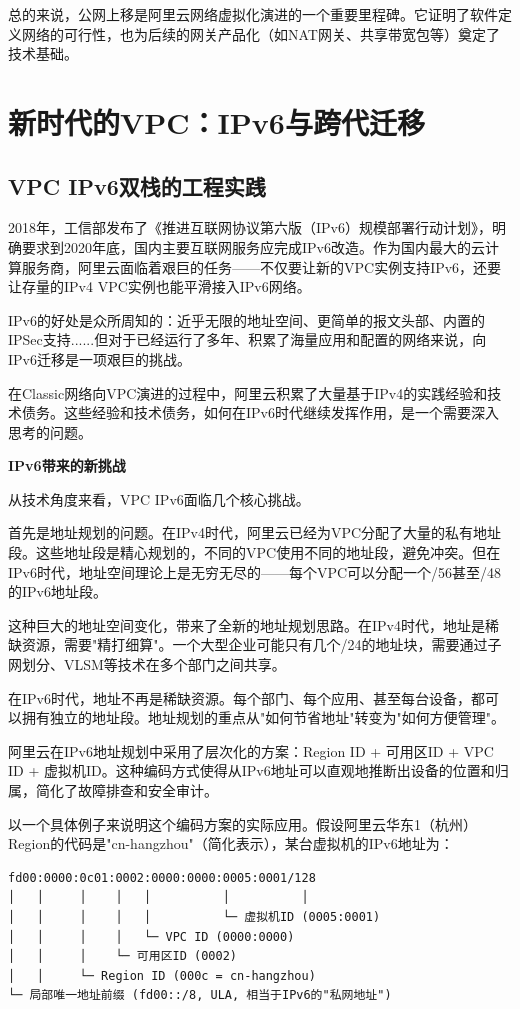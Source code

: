 总的来说，公网上移是阿里云网络虚拟化演进的一个重要里程碑。它证明了软件定义网络的可行性，也为后续的网关产品化（如NAT网关、共享带宽包等）奠定了技术基础。

\section{新时代的VPC：IPv6与跨代迁移}

\subsection{VPC IPv6双栈的工程实践}

2018年，工信部发布了《推进互联网协议第六版（IPv6）规模部署行动计划》，明确要求到2020年底，国内主要互联网服务应完成IPv6改造。作为国内最大的云计算服务商，阿里云面临着艰巨的任务——不仅要让新的VPC实例支持IPv6，还要让存量的IPv4 VPC实例也能平滑接入IPv6网络。

IPv6的好处是众所周知的：近乎无限的地址空间、更简单的报文头部、内置的IPSec支持......但对于已经运行了多年、积累了海量应用和配置的网络来说，向IPv6迁移是一项艰巨的挑战。

在Classic网络向VPC演进的过程中，阿里云积累了大量基于IPv4的实践经验和技术债务。这些经验和技术债务，如何在IPv6时代继续发挥作用，是一个需要深入思考的问题。

\textbf{IPv6带来的新挑战}

从技术角度来看，VPC IPv6面临几个核心挑战。

首先是地址规划的问题。在IPv4时代，阿里云已经为VPC分配了大量的私有地址段。这些地址段是精心规划的，不同的VPC使用不同的地址段，避免冲突。但在IPv6时代，地址空间理论上是无穷无尽的——每个VPC可以分配一个/56甚至/48的IPv6地址段。

这种巨大的地址空间变化，带来了全新的地址规划思路。在IPv4时代，地址是稀缺资源，需要"精打细算"。一个大型企业可能只有几个/24的地址块，需要通过子网划分、VLSM等技术在多个部门之间共享。

在IPv6时代，地址不再是稀缺资源。每个部门、每个应用、甚至每台设备，都可以拥有独立的地址段。地址规划的重点从"如何节省地址"转变为"如何方便管理"。

阿里云在IPv6地址规划中采用了层次化的方案：Region ID + 可用区ID + VPC ID + 虚拟机ID。这种编码方式使得从IPv6地址可以直观地推断出设备的位置和归属，简化了故障排查和安全审计。

以一个具体例子来说明这个编码方案的实际应用。假设阿里云华东1（杭州）Region的代码是"cn-hangzhou"（简化表示），某台虚拟机的IPv6地址为：

\begin{verbatim}
fd00:0000:0c01:0002:0000:0000:0005:0001/128
│   │     │    │   │          │          │
│   │     │    │   │          └─ 虚拟机ID (0005:0001)
│   │     │    │   └─ VPC ID (0000:0000)
│   │     │    └─ 可用区ID (0002)
│   │     └─ Region ID (000c = cn-hangzhou)
└─ 局部唯一地址前缀 (fd00::/8, ULA, 相当于IPv6的"私网地址")
\end{verbatim}

